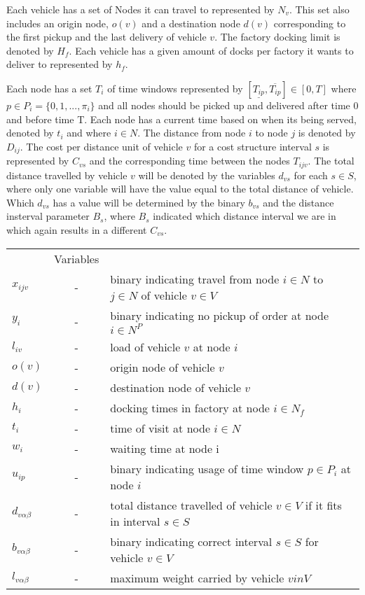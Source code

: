 \documentclass[a4paper,10pt]{article}
\begin{document}
Each vehicle has a set of Nodes it can travel to represented by $N_v$.
This set also includes an origin node, $o(v)$ and a destination node $d(v)$ corresponding to the first pickup and the last delivery of vehicle $v$. 
The factory docking limit is denoted by $H_f$. 
Each vehicle has a given amount of docks per factory it wants to deliver to represented by $h_{f}$. \par 
Each node has a set $T_{i}$ of time windows represented by $[ \underline{T_{ip}},  \overline{T_{ip}} ] \in [0,T]$ where $p \in P_i=\{0,1,...,\pi_i\}$ and all nodes should be picked up and delivered after time 0 and before time T. 
Each node has a current time based on when its being served, denoted by $t_{i}$ and where $i \in N$. 
The distance from node $i$ to node $j$ is denoted by $D_{ij}$. 
The cost per distance unit of vehicle $v$ for a cost structure interval $s$ is represented by $C_{vs}$ and the corresponding time between the nodes $T_{ijv}$. 
The total distance travelled by vehicle $v$ will be denoted by the variables $d_{vs}$ for each $s\in S$, where only one variable will have the value equal to the total distance of vehicle. 
Which $d_{vs}$ has a value will be determined by the binary $b_{vs}$ and the distance insterval parameter $B_s$, where $B_s$ indicated which distance interval we are in which again results in a different $C_{vs}$. 
\linebreak

\begin{tabular} {l c l}
    			&Variables										\\
	$x_{ijv}$	&-& 	binary indicating travel from node $i\in N$ to $j\in N$ of vehicle $v\in V$	\\
    	$y_i    $ 	&-& 	binary indicating no pickup of order at node $i\in N^P$				\\
	$l_{iv}	$	&-&	load of vehicle $v$ at node $i$							\\ 
    	$o(v)   $ 	&-& 	origin node of vehicle $v$							\\
	$d(v)	$	&-&	destination node of vehicle $v$							\\
	$h_i	$	&-&	docking times in factory at node $i\in N_f$					\\
	$t_i 	$	&-&	time of visit at node $i\in N$							\\
    	$w_i	$ 	&-& 	waiting time at node i								\\ 
	$u_{ip}	$	&-&	binary indicating usage of time window $p\in P_i$ at node $i$			\\
    	$d_{v\alpha\beta} $	&-& 	total distance travelled of vehicle $v\in V$ if it fits in interval $s\in S$	\\
	$b_{v\alpha\beta} $	&-&	binary indicating correct interval $s\in S$ for vehicle $v\in V$		\\
	$l_{v\alpha\beta}$ &-&	maximum weight carried by vehicle $v in V$				\\

\end{tabular}
\linebreak
\linebreak
\par
\end{document}
